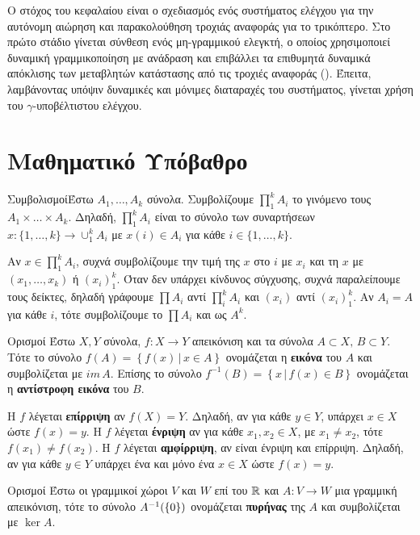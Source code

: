 Ο στόχος του κεφαλαίου είναι ο σχεδιασμός ενός συστήματος ελέγχου για την 
αυτόνομη αιώρηση και παρακολούθηση τροχιάς αναφοράς για το τρικόπτερο. Στο πρώτο
στάδιο γίνεται σύνθεση ενός μη-γραμμικού ελεγκτή, ο οποίος χρησιμοποιεί 
δυναμική γραμμικοποίηση με ανάδραση και επιβάλλει τα επιθυμητά δυναμικά 
απόκλισης των μεταβλητών κατάστασης από τις τροχιές αναφοράς 
(). Έπειτα, λαμβάνοντας υπόψιν δυναμικές και μόνιμες 
διαταραχές του συστήματος, γίνεται χρήση του $\gamma$-υποβέλτιστου ελέγχου.

\section{Μαθηματικό Υπόβαθρο}

\begin{nameddefn}{Συμβολισμοί}Έστω $A_1, \ldots, A_k$ σύνολα. Συμβολίζουμε
$\prod _1^{k} A_i$ το γινόμενο τους $A_1 \times \ldots \times A_k$. Δηλαδή,   
$\prod_1^k A_i$ είναι το σύνολο των συναρτήσεων $x:\{1,\ldots,k\} \rightarrow
\cup_1^k A_i$ με $ x(i) \in A_i$ για κάθε $i \in \{1,\ldots,k\}$.

Αν $x \in \prod _1^k A_i$, συχνά συμβολίζουμε την τιμή της $x$ στο $i$ με $x_i$ 
και τη $x$ με $\left(x_1, \ldots, x_k\right)$ ή $\left(x_i\right)_1^k$. Όταν δεν 
υπάρχει κίνδυνος σύγχυσης, συχνά παραλείπουμε τους δείκτες, δηλαδή γράφουμε 
$\prod A_i$ αντί $\prod_i^k A_i$ και $\left(x_i\right)$ αντί $\left(x_i\right)_1
^k$. Αν $A_i = A$ για κάθε $i$, τότε συμβολίζουμε το $\prod A_i$ και ως $A^k$.
\end{nameddefn}
\begin{nameddefn}{Ορισμοί}
    Έστω $X,Y$ σύνολα, $f:X \rightarrow Y$ απεικόνιση και τα σύνολα $A \subset 
    X,\, B\subset Y$. Τότε το σύνολο $f(A)=\left\{f(x)\,|\,x \in A \right\}$ 
    ονομάζεται η \textbf{εικόνα} του $A$ και συμβολίζεται με $im\,A$. Επίσης 
    το σύνολο $f^{-1}(B)=\left\{x\,|\,f(x) \in B\right\}$ ονομάζεται η 
    \textbf{αντίστροφη εικόνα} του $B$.
    
    Η $f$ λέγεται \textbf{επίρριψη} αν $f(X) = Y$. Δηλαδή, αν για κάθε $y\in Y$,  
    υπάρχει $x \in X$ ώστε $f(x) = y$. Η $f$ λέγεται \textbf{ένριψη} αν για κάθε
    $x_1, x_2 \in X$, με $x_1 \ne x_2$, τότε $f(x_1) \ne f(x_2)$. Η $f$ 
    λέγεται \textbf{αμφίρριψη}, αν είναι ένριψη και επίρριψη. Δηλαδή, αν για 
    κάθε $y \in Y$ υπάρχει ένα και μόνο ένα $x \in X$ ώστε $f(x) = y$.
\end{nameddefn}
\begin{nameddefn}{Ορισμοί}
    Έστω οι γραμμικοί χώροι $V$ και $W$ επί του $\mathbb{R}$ και $A:V\rightarrow W$
    μια γραμμική απεικόνιση, τότε το σύνολο $A^{-1}(\set 0)$ ονομάζεται 
    \textbf{πυρήνας} της $A$ και συμβολίζεται με $\ker A$.
    \label{kern}
\end{nameddefn}
